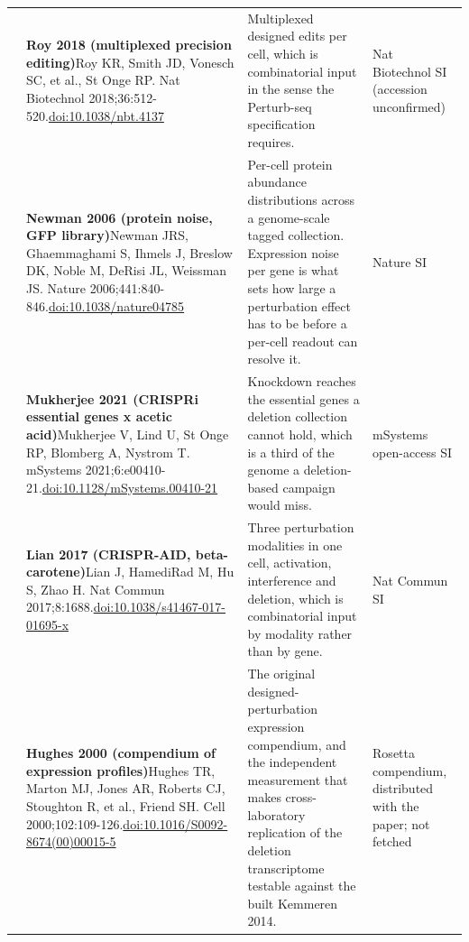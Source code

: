 \begin{landscape}
\begin{longtable}{@{}r@{\hspace{4pt}} L{86mm} L{92mm} L{62mm}@{}}
 & \textbf{Roy 2018 (multiplexed precision editing)}\newline Roy KR, Smith JD, Vonesch SC, et al., St Onge RP. Nat Biotechnol 2018;36:512-520.\newline \href{https://doi.org/10.1038/nbt.4137}{doi:10.1038/\allowbreak nbt.4137} & Multiplexed designed edits per cell, which is combinatorial input in the sense the Perturb-seq specification requires. & Nat Biotechnol SI (accession unconfirmed) \\
 & \textbf{Newman 2006 (protein noise, GFP library)}\newline Newman JRS, Ghaemmaghami S, Ihmels J, Breslow DK, Noble M, DeRisi JL, Weissman JS. Nature 2006;441:840-846.\newline \href{https://doi.org/10.1038/nature04785}{doi:10.1038/\allowbreak nature04785} & Per-cell protein abundance distributions across a genome-scale tagged collection. Expression noise per gene is what sets how large a perturbation effect has to be before a per-cell readout can resolve it. & Nature SI \\
 & \textbf{Mukherjee 2021 (CRISPRi essential genes x acetic acid)}\newline Mukherjee V, Lind U, St Onge RP, Blomberg A, Nystrom T. mSystems 2021;6:e00410-21.\newline \href{https://doi.org/10.1128/mSystems.00410-21}{doi:10.1128/\allowbreak mSystems.00410-21} & Knockdown reaches the essential genes a deletion collection cannot hold, which is a third of the genome a deletion-based campaign would miss. & mSystems open-access SI \\
 & \textbf{Lian 2017 (CRISPR-AID, beta-carotene)}\newline Lian J, HamediRad M, Hu S, Zhao H. Nat Commun 2017;8:1688.\newline \href{https://doi.org/10.1038/s41467-017-01695-x}{doi:10.1038/\allowbreak s41467-017-01695-x} & Three perturbation modalities in one cell, activation, interference and deletion, which is combinatorial input by modality rather than by gene. & Nat Commun SI \\
 & \textbf{Hughes 2000 (compendium of expression profiles)}\newline Hughes TR, Marton MJ, Jones AR, Roberts CJ, Stoughton R, et al., Friend SH. Cell 2000;102:109-126.\newline \href{https://doi.org/10.1016/S0092-8674(00)00015-5}{doi:10.1016/\allowbreak S0092-8674(00)00015-5} & The original designed-perturbation expression compendium, and the independent measurement that makes cross-laboratory replication of the deletion transcriptome testable against the built Kemmeren 2014. & Rosetta compendium, distributed with the paper; not fetched \\

\end{longtable}
\end{landscape}
